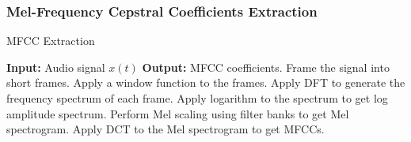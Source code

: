 \subsubsection{Mel-Frequency Cepstral Coefficients Extraction}

\begin{algorithm}[H]
    \caption{MFCC Extraction}
    \begin{algorithmic}[1]
        
    \STATE \textbf{Input:} Audio signal $x(t)$
    \STATE \textbf{Output:} MFCC coefficients.
    \STATE Frame the signal into short frames.
    \STATE Apply a window function to the frames.
    \STATE Apply DFT to generate the frequency spectrum of each frame.
    \STATE Apply logarithm to the spectrum to get log amplitude spectrum.
    \STATE Perform Mel scaling using filter banks to get Mel spectrogram.
    \STATE Apply DCT to the Mel spectrogram to get MFCCs.
    \end{algorithmic}
\end{algorithm}

\newpage


